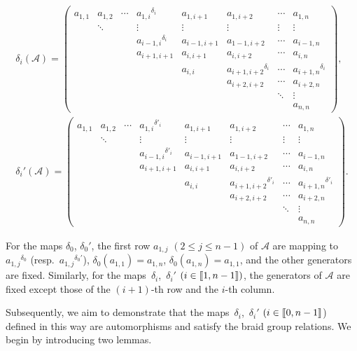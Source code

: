 \documentclass[10pt,a4paper]{amsart}
\numberwithin{equation}{section}
\def\d{\delta}
\def\A{\mathscr{A}}
\def\lbb#1{\left[\kern-0.15em\left[ {#1} \right] \kern-0.15em\right]}
\begin{document}
\begin{gather*}%
\d_i(\A)=
\begin{pmatrix}
 a_{1,1} &a_{1,2} & \cdots & {a_{1,i}}^{\d_i} & a_{1,i+1} & a_{1,i+2}& \cdots & a_{1,n} \\
 &\ddots & &\vdots & \vdots & \vdots & \vdots & \vdots\\
 & & & {a_{i-1,i}}^{\d_i} & a_{i-1,i+1} & a_{1-1,i+2}& \cdots & a_{i-1,n} \\
 & & &a_{i+1,i+1}& a_{i,i+1} & a_{i,i+2} &\cdots & a_{i,n} \\
 & & & & a_{i,i} & {a_{i+1,i+2}}^{\d_i}& \cdots & {a_{i+1,n}}^{\d_i} \\
 & & & & & a_{i+2,i+2}& \cdots & a_{i+2,n}\\
 & & & & & &\ddots & \vdots\\
 & & & & & & & a_{n,n}
\end{pmatrix}
,\\
\d_i'(\A)=
\begin{pmatrix}
 a_{1,1} &a_{1,2} & \cdots & {a_{1,i}}^{\d'_i} & a_{1,i+1} & a_{1,i+2}& \cdots & a_{1,n} \\
 &\ddots & &\vdots & \vdots & \vdots & \vdots & \vdots\\
 & & & {a_{i-1,i}}^{\d'_i} & a_{i-1,i+1} & a_{1-1,i+2}& \cdots & a_{i-1,n} \\
 & & &a_{i+1,i+1}& a_{i,i+1} & a_{i,i+2} &\cdots & a_{i,n} \\
 & & & & a_{i,i} & {a_{i+1,i+2}}^{\d'_i}& \cdots & {a_{i+1,n}}^{\d'_i} \\
 & & & & & a_{i+2,i+2}& \cdots & a_{i+2,n}\\
 & & & & & &\ddots & \vdots\\
 & & & & & & & a_{n,n}
\end{pmatrix}
.
\end{gather*}


For the maps $\delta_0$, $ \delta_0'$, the first row $a_{1,j}$ $(2\leq j\leq n-1)$ of $\A$ are mapping to ${a_{1,j}}^{\delta_0}$ \big(resp.~${a_{1,j}}^{\delta_0'}$\big), $\delta_0(a_{1,1})=a_{1,n}$, $\delta_0(a_{1,n})=a_{1, 1}$, and the other generators are fixed.
Similarly, for the maps~$\d_i$,~$\d_i'$ $(i \in \lbb{1,n-1})$, the generators of $\A$ are fixed except those of the $(i+1)$-th row and the $i$-th column.

Subsequently, we aim to demonstrate that the maps~$\d_i$,~$\d_i'$ $(i \in \lbb{0,n-1}$) defined in this way are automorphisms and satisfy the braid group relations.
We begin by introducing two lemmas.
\end{document}
